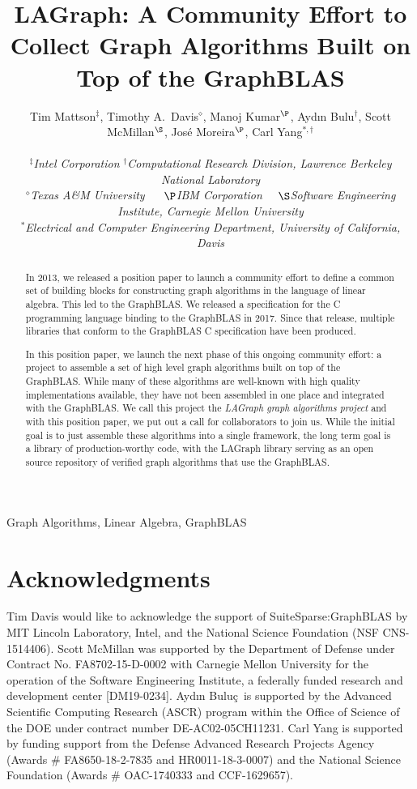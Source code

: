 \documentclass[10pt, conference, compsocconf,letter]{IEEEtran}
\title{LAGraph: A Community Effort to Collect Graph Algorithms Built on Top of the GraphBLAS}
\author{
Tim Mattson$^\ddag$, Timothy A.~Davis$^\diamond$, Manoj Kumar$^\P$, Ayd\i n Bulu\qc$^\dag$, Scott McMillan$^\S$, Jos\'e Moreira$^\P$, Carl Yang$^{*,\dag}$ \\
\\

 \normalsize
 {\em $^\ddag$Intel Corporation}  {\em $^\dag$Computational Research Division, Lawrence Berkeley National Laboratory} \\
{\em $^\diamond$Texas A\&M University} ~~ {\em $\P$IBM Corporation}~~ {\em $\S$Software Engineering Institute, Carnegie Mellon University}   \\
{\em $^*$Electrical and Computer Engineering Department, University of California, Davis}
 }
\newcommand{\qc}{\c{c}}
\begin{document}
\maketitle

\begin{abstract}

In 2013, we released a position paper to launch a community effort to define a 
common set of building blocks for constructing graph algorithms in the language of linear algebra.
This led to the GraphBLAS.   We released a specification for the C programming language binding to the
GraphBLAS in 2017.  Since that release, multiple libraries that conform to the 
GraphBLAS C specification have been produced.

In this position paper, we launch the next phase of this ongoing community effort: a project to
assemble a set of high level graph algorithms built on top of the GraphBLAS.  While many 
of these algorithms are well-known with high quality implementations available,
they have not been assembled in one place and integrated with the GraphBLAS.  We call 
this project the \emph{LAGraph graph algorithms project} and with this position paper, we put out a 
call for collaborators to join us.  While the initial goal is to just assemble
these algorithms into a single framework, the long term goal is a library of production-worthy code,
with the LAGraph library serving as an open source repository of verified graph algorithms that use the
GraphBLAS. 

\end{abstract}

\begin{IEEEkeywords}
Graph Algorithms, Linear Algebra, GraphBLAS
\end{IEEEkeywords}











\section*{Acknowledgments}

Tim Davis would like to acknowledge the support of SuiteSparse:GraphBLAS by MIT
Lincoln Laboratory, Intel, and the National Science Foundation (NSF
CNS-1514406).  Scott McMillan was supported by the Department of 
Defense under Contract No. FA8702-15-D-0002 with Carnegie Mellon 
University for the operation of the Software Engineering Institute, 
a federally funded research and development center [DM19-0234].
Ayd\i n Bulu\qc~is supported by the Advanced Scientific Computing Research (ASCR) program within
the Office of Science of the DOE under contract number DE-AC02-05CH11231. Carl Yang is supported by funding support from the Defense Advanced Research Projects Agency (Awards \# FA8650-18-2-7835 and HR0011-18-3-0007) and the National Science Foundation (Awards \# OAC-1740333 and CCF-1629657).



\end{document}
